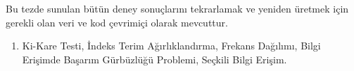 \begin{spacing}{1.1}
Bu tezde sunulan b\"{u}t\"{u}n deney sonu\c{c}lar{\i}n{\i} tekrarlamak ve yeniden \"{u}retmek i\c{c}in gerekli olan veri ve kod \c{c}evrimi\c{c}i olarak mevcuttur.\

\setlength\leftmargini{4.0cm}
\begin{enumerate}[label=\textbf{Anahtar S\"{o}zc\"{u}kler:}]
  \item Ki-Kare Testi, \.{I}ndeks Terim A\u{g}{\i}rl{\i}kland{\i}rma, Frekans Da\u{g}{\i}l{\i}m{\i}, Bilgi Eri\c{s}imde Ba\c{s}ar{\i}m G\"{u}rb\"{u}zl\"{u}\u{g}\"{u} Problemi, Se\c{c}kili Bilgi Eri\c{s}im.
\end{enumerate}

\end{spacing}
